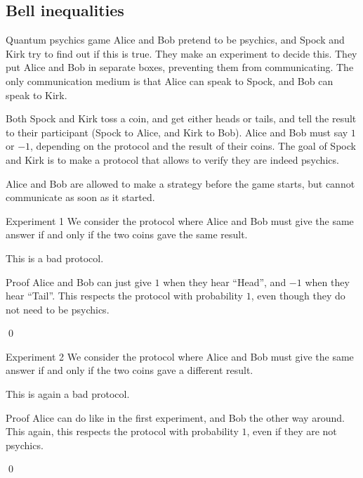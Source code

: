 \documentclass[a4paper]{article}
\begin{document}
\subsection{Bell inequalities}

\begin{parag}{Quantum psychics game}
    Alice and Bob pretend to be psychics, and Spock and Kirk try to find out if this is true. They make an experiment to decide this. They put Alice and Bob in separate boxes, preventing them from communicating. The only communication medium is that Alice can speak to Spock, and Bob can speak to Kirk. 

    Both Spock and Kirk toss a coin, and get either heads or tails, and tell the result to their participant (Spock to Alice, and Kirk to Bob). Alice and Bob must say $1$ or $-1$, depending on the protocol and the result of their coins. The goal of Spock and Kirk is to make a protocol that allows to verify they are indeed psychics.

    Alice and Bob are allowed to make a strategy before the game starts, but cannot communicate as soon as it started.
\end{parag}

\begin{parag}{Experiment 1}
    We consider the protocol where Alice and Bob must give the same answer if and only if the two coins gave the same result.

    This is a bad protocol.

    \begin{subparag}{Proof}
        Alice and Bob can just give $1$ when they hear ``Head'', and $-1$ when they hear ``Tail''. This respects the protocol with probability $1$, even though they do not need to be psychics.

        \qed
    \end{subparag}
\end{parag}

\begin{parag}{Experiment 2}
    We consider the protocol where Alice and Bob must give the same answer if and only if the two coins gave a different result.

    This is again a bad protocol.

    \begin{subparag}{Proof}
        Alice can do like in the first experiment, and Bob the other way around. This again, this respects the protocol with probability $1$, even if they are not psychics.

        \qed
    \end{subparag}
\end{parag}
\end{document}
